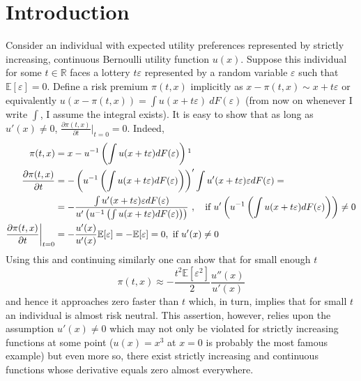 \documentclass[a4paper]{article}
\newcommand{\expect}{\mathbb{E}}
\newcommand{\eps}{\varepsilon}
\begin{document}
	\section{Introduction}
	Consider an individual with expected utility preferences represented by strictly increasing, continuous Bernoulli utility function $u(x)$. Suppose this individual for some $t \in \mathbb{R}$ faces a lottery $t \eps$ represented by a random variable $\varepsilon$ such that $\expect[\varepsilon] = 0$. Define a risk premium $\pi(t, x)$ implicitly as $x-\pi(t, x) \sim x+t\eps$ or equivalently $u(x - \pi(t, x)) = \int u(x + t \eps)\ dF(\eps)$ (from now on whenever I write $\int$, I assume the integral exists). It is easy to show that as long as $u'(x) \neq 0$, $\frac{\partial \pi(t, x)}{\partial t}\bigg|_{t=0} = 0$. Indeed, 
	\begin{align*}
	\pi(t, x) &= x - u^{-1}\left( \int u(x + t \varepsilon) dF(\varepsilon) \right) \footnotemark\\
	\frac{\partial \pi(t, x)}{\partial t} &= -\left(u^{-1}\left( \int u(x + t \varepsilon) dF(\varepsilon) \right) \right)' \int u'(x+t \varepsilon)\varepsilon dF(\varepsilon) = \\
	&=-\frac{\int u'(x+t \varepsilon)\varepsilon dF(\varepsilon)}{u'\left(u^{-1}\left( \int u(x + t \varepsilon) dF(\varepsilon) \right)\right)}\ ,\ \ \  \text{if }u'\left(u^{-1}\left( \int u(x + t \varepsilon) dF(\varepsilon) \right)\right) \neq 0\\
	\frac{\partial \pi(t, x)}{\partial t}\bigg|_{t=0} &= -\frac{u'(x)}{u'(x)} \expect[\eps] = -\expect[\eps] = 0, \text{ if } u'(x) \neq 0
	\end{align*}
Using this and continuing similarly one can show that for small enough $t$ $$\pi(t, x) \approx -\frac{t^2 \expect[\eps^2]}{2}\frac{u''(x)}{u'(x)}$$ and hence it approaches zero faster than $t$ which, in turn, implies that for small $t$ an individual is almost risk neutral. This assertion, however, relies upon the assumption $u'(x) \neq 0$ which may not only be violated for strictly increasing functions at some point ($u(x) = x^3$ at $x=0$ is probably the most famous example) but even more so, there exist strictly increasing and continuous functions whose derivative equals zero almost everywhere. 
\end{document}

